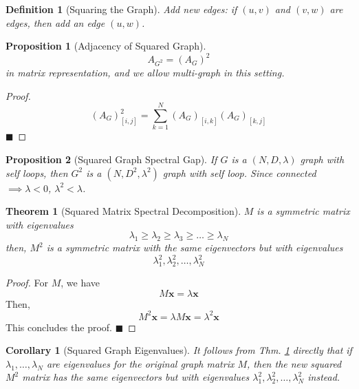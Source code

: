 \documentclass[11pt, letter]{book}
\newcommand{\bx}{\mathbf{x}}
\newcommand{\qed}{\hfill $\blacksquare$}
\newtheorem{theorem}{Theorem}[chapter]
\newtheorem{corollary}{Corollary}[theorem]
\newtheorem{proposition}{Proposition}[chapter]
\newtheorem{definition}{Definition}[chapter]
\begin{document}
\begin{definition}[Squaring the Graph]
	Add new edges: if $(u, v)$ and $(v, w)$ are edges, then add an edge $(u, w)$. 
\end{definition}

\begin{proposition}[Adjacency of Squared Graph]
	\begin{equation}
		A_{G^2} = ( A_G ) ^ 2
	\end{equation}
	in matrix representation, and we allow multi-graph in this setting. 
\end{proposition}

\begin{proof}
	\begin{equation}
		(A_G)^2_{[i, j]} = \sum_{k = 1}^N (A_{G})_{[i, k]} (A_{G})_{[k, j]}
	\end{equation}
	\qed
\end{proof}

\begin{proposition}[Squared Graph Spectral Gap]
	If $G$ is a $(N, D, \lambda)$ graph with self loops, then $G^2$ is a $(N, D^2, \lambda^2)$ graph with self loop. Since connected $\implies \lambda < 0$, $\lambda^2 < \lambda$.
\end{proposition}

\begin{theorem}[Squared Matrix Spectral Decomposition]
	\label{thm:squared_matrix_spectral_decomposition}
	$M$ is a symmetric matrix with eigenvalues
	\begin{equation}
		\lambda_1 \geq \lambda_2 \geq \lambda_3 \geq \dots \geq \lambda_N
	\end{equation}
	then, $M^2$ is a symmetric matrix with the same eigenvectors but with eigenvalues
	\begin{equation}
		\lambda_1^2, \lambda_2^2, \dots, \lambda_N^2 
	\end{equation}
\end{theorem}

\begin{proof}
	For $M$, we have
	\begin{equation}
		M\bx = \lambda \bx
	\end{equation}
	Then, 
	\begin{equation}
		M^2 \bx = \lambda M\bx = \lambda^2 \bx
	\end{equation}
	This concludes the proof. \qed
\end{proof}

\begin{corollary}[Squared Graph Eigenvalues]
	It follows from Thm. \ref{thm:squared_matrix_spectral_decomposition} directly that if $\lambda_1, \dots, \lambda_N$ are eigenvalues for the original graph matrix $M$, then the new squared $M^2$ matrix has the same eigenvectors but with eigenvalues $\lambda_1^2, \lambda_2^2, \dots, \lambda_N^2 $ instead. 
\end{corollary}
\end{document}
